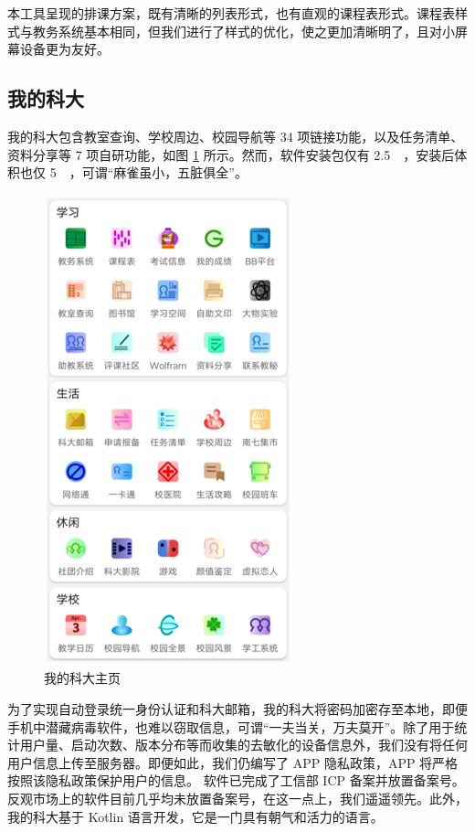 本工具呈现的排课方案，既有清晰的列表形式，也有直观的课程表形式。课程表样式与教务系统基本相同，但我们进行了样式的优化，使之更加清晰明了，且对小屏幕设备更为友好。

\subsection{我的科大}

我的科大包含教室查询、学校周边、校园导航等 34 项链接功能，以及任务清单、资料分享等 7 项自研功能，如图 \ref{fig:m1} 所示。然而，软件安装包仅有 \qty{2.5}{\mega\byte}，安装后体积也仅 \qty{5}{\mega\byte}，可谓“麻雀虽小，五脏俱全”。

\begin{figure}[htb]
  \centering
  \includegraphics[width=0.67\columnwidth]{figure/m1.png}
  \caption{我的科大主页}
  \label{fig:m1}
\end{figure}

为了实现自动登录统一身份认证和科大邮箱，我的科大将密码加密存至本地，即便手机中潜藏病毒软件，也难以窃取信息，可谓“一夫当关，万夫莫开”。除了用于统计用户量、启动次数、版本分布等而收集的去敏化的设备信息外，我们没有将任何用户信息上传至服务器。即便如此，我们仍编写了 APP 隐私政策，APP 将严格按照该隐私政策保护用户的信息。
软件已完成了工信部 ICP 备案并放置备案号。反观市场上的软件目前几乎均未放置备案号，在这一点上，我们遥遥领先。此外，我的科大基于 Kotlin 语言开发，它是一门具有朝气和活力的语言。

